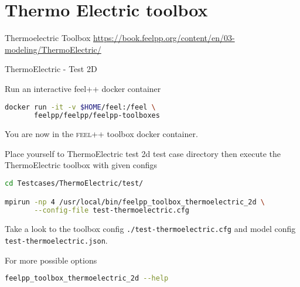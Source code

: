 \section[ThermoElectric]{Thermo Electric toolbox}

\begin{frame}[standout]{Thermoelectric Toolbox}
  \url{https://book.feelpp.org/content/en/03-modeling/ThermoElectric/}
\end{frame}


\begin{frame}{ThermoElectric - Test 2D}

Run an interactive feel++ docker container

\begin{lstlisting}[language=Bash,mathescape=false,emph={docker}]
docker run -it -v $HOME/feel:/feel \
       feelpp/feelpp/feelpp-toolboxes
\end{lstlisting}

You are now in the \textsc{feel++} toolbox docker container.

Place yourself to ThermoElectric test 2d test case directory then execute the
ThermoElectric toolbox with given configs

\begin{lstlisting}[language=Bash,mathescape=false, emph={feelpp_toolbox_thermoelectric_2d}]
cd Testcases/ThermoElectric/test/

mpirun -np 4 /usr/local/bin/feelpp_toolbox_thermoelectric_2d \
       --config-file test-thermoelectric.cfg
\end{lstlisting}

Take a look to the toolbox config \lstinline{./test-thermoelectric.cfg} and model config
\lstinline{test-thermoelectric.json}.

For more possible options
\begin{lstlisting}[language=Bash,mathescape=false, emph={feelpp_toolbox_thermoelectric_2d}]
feelpp_toolbox_thermoelectric_2d --help
\end{lstlisting}

\end{frame}


